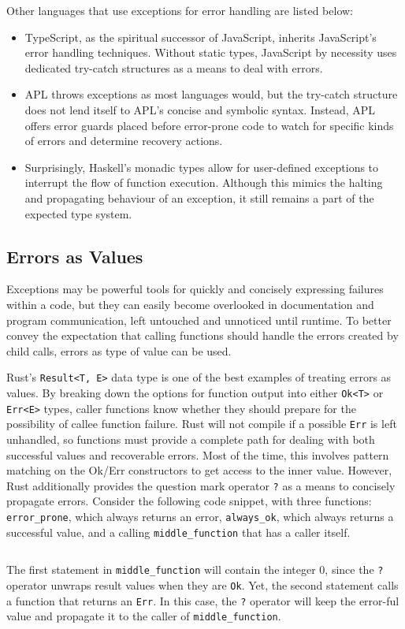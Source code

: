 \documentclass{article}
\begin{document}
Other languages that use exceptions for error handling are listed below:
\begin{itemize}
    \item TypeScript, as the spiritual successor of JavaScript, inherits JavaScript's
    error handling techniques. Without static types, JavaScript by necessity uses
    dedicated try-catch structures as a means to deal with errors.
    \item APL throws exceptions as most languages would, but the try-catch structure does not lend itself to
    APL's concise and symbolic syntax. Instead, APL offers error guards placed before error-prone code
    to watch for specific kinds of errors and determine recovery actions.
    \item Surprisingly, Haskell's monadic types allow for user-defined exceptions to interrupt the flow of function execution.
    Although this mimics the halting and propagating behaviour of an exception,
    it still remains a part of the expected type system.
\end{itemize}

\subsection{Errors as Values}

Exceptions may be powerful tools for quickly and concisely expressing failures within a code, but they can
easily become overlooked in documentation and program communication, left untouched and unnoticed until runtime.
To better convey the expectation that calling functions should handle the errors created by child calls,
errors as type of value can be used.

Rust's \texttt{Result<T, E>} data type is one of the best examples of treating errors as values.
By breaking down the options for function output into either \texttt{Ok<T>} or \texttt{Err<E>}
types, caller functions know whether they should prepare for the possibility of callee function failure.
Rust will not compile if a possible \texttt{Err} is left unhandled,
so functions must provide a complete path for dealing with both successful values and recoverable errors.
Most of the time, this involves pattern matching on the Ok/Err constructors to get access to the inner value.
However, Rust additionally provides the question mark operator \texttt{?} as a means to concisely propagate errors.
Consider the following code snippet, with three functions: \texttt{error\_prone}, which always returns an error,
\texttt{always\_ok}, which always returns a successful value, and a calling \texttt{middle\_function}
that has a caller itself.
\inputminted{rust}{linked_list/err.rs}
The first statement in \texttt{middle\_function} will contain the integer 0, since the \texttt{?} operator
unwraps result values when they are \texttt{Ok}. Yet, the second statement calls a function that returns an \texttt{Err}.
In this case, the \texttt{?} operator will keep the error-ful value and propagate it to the caller of \texttt{middle\_function}.
\end{document}
